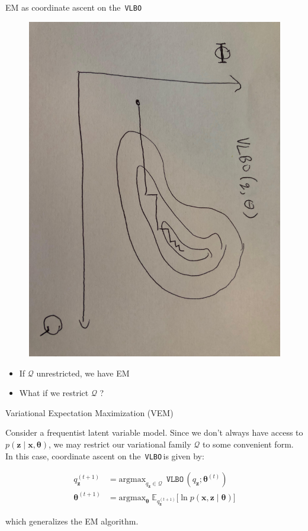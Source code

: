 \documentclass[10pt]{beamer}
\newcommand{\+}[1]{\ensuremath{{\boldsymbol #1}}} %
\newcommand{\cond}{\; | \;}
\newcommand{\E}{\mathbb{E}}
\newcommand{\KL}[2] {\texttt{KL} \big({#1} \; \big|\big| \; {#2} \big)}
\newcommand{\Q}{\mathcal{Q}}
\newcommand{\VLBO}{\,\texttt{VLBO}\,}
\begin{document}
\begin{frame}{EM as coordinate ascent on the \VLBO }

	\begin{figure}
	\includegraphics[width=.55\textwidth, angle=90]{images/em_is_perfect_vi.jpg}
	\end{figure}

 
\begin{itemize}
\item If $\Q$ unrestricted, we have EM   
\item What if we restrict $\Q$ ?
\end{itemize}

\end{frame}


\begin{frame}{Variational Expectation Maximization (VEM)}

Consider a \alert{frequentist latent variable model}. Since we don't always have access to $p(\+z \cond \+x, \+\theta)$, we may restrict our variational family $\Q$ to some convenient form.  In this case, 
coordinate ascent on the \VLBO is given by:

\begin{align*}
q_{\+z}^{(t+1)} &= \text{argmax}_{q_\+z \in \mathcal{Q}} \; \VLBO  (q_\+z ; \+\theta^{(t)} )\label{ve_update} \\ 
\+\theta^{(t+1)} &= \text{argmax}_{\+\theta} \; \E_{q_{\+z}^{(t+1)}} \bigg[ \ln p(\+x, \+z \cond \+\theta) \bigg]
\end{align*} 

which generalizes the EM algorithm. %
\end{frame}
\end{document}
